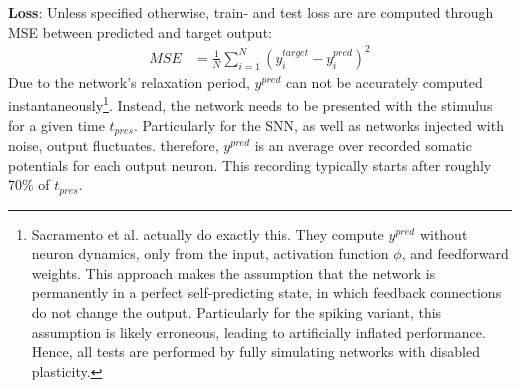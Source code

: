 \textbf{Loss}: Unless specified otherwise, train- and test loss are are computed through MSE between predicted and
target output:
\begin{align*}
  MSE & = \frac{1}{N} \sum_{i=1}^N \left( y^{target}_i-y^{pred}_i \right)^2
\end{align*}
Due to the network's relaxation period, $y^{pred}$ can not be accurately computed instantaneously\footnote{Sacramento et
  al. actually do exactly this. They compute $y^{pred}$ without neuron dynamics, only from the input, activation
  function $\phi$, and feedforward weights. This approach makes the assumption that the network is permanently in a
  perfect self-predicting state, in which feedback connections do not change the output. Particularly for the spiking
  variant, this assumption is likely erroneous, leading to artificially inflated performance. Hence, all tests are
  performed by fully simulating networks with disabled plasticity.}. Instead, the network needs to be presented with the
stimulus for a given time $t_{pres}$. Particularly for the SNN, as well as networks injected with noise, output
fluctuates. therefore, $y^{pred}$ is an average over recorded somatic potentials for each output neuron. This
recording typically starts after roughly $70\%$ of $t_{pres}$.